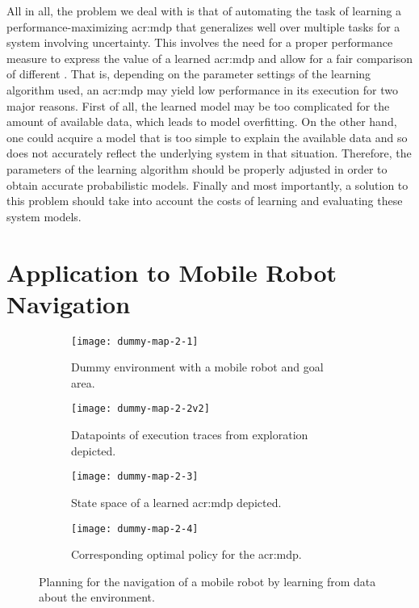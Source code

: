 All in all, the problem we deal with is that of automating the task of learning a performance-maximizing \acrshort{acr:mdp} that generalizes well over multiple tasks for a system involving uncertainty.
This involves the need for a proper performance measure to express the value of a learned \acrshort{acr:mdp} and allow for a fair comparison of different .
That is, depending on the parameter settings of the learning algorithm used, an \acrshort{acr:mdp} may yield low performance in its execution for two major reasons.
First of all, the learned model may be too complicated for the amount of available data, which leads to model overfitting.
On the other hand, one could acquire a model that is too simple to explain the available data and so does not accurately reflect the underlying system in that situation.
Therefore, the parameters of the learning algorithm should be properly adjusted in order to obtain accurate probabilistic models.
Finally and most importantly, a solution to this problem should take into account the costs of learning and evaluating these system models.

\section{Application to Mobile Robot Navigation}
\label{sec:application-mobile-robot}

\begin{figure}[t]
	\centering
	
	\captionsetup{font=small}
	\captionsetup[subfigure]{font=footnotesize}
	\captionsetup[subfigure]{justification=centering}
	\begin{subfigure}{.5\textwidth}
		\centering
		\texttt{[image: dummy-map-2-1]}
		\caption{Dummy environment with a mobile robot and goal area.}
		\label{fig:dummy-map-1}
	\end{subfigure}\hfill
	\begin{subfigure}{.5\textwidth}
		\centering
		\texttt{[image: dummy-map-2-2v2]}
		\caption{Datapoints of execution traces from exploration depicted.}
		\label{fig:dummy-map-2}
	\end{subfigure}
	
	\bigskip
	
	\begin{subfigure}{.5\textwidth}
		\centering
		\texttt{[image: dummy-map-2-3]}
		\caption{State space of a learned \acrshort{acr:mdp} depicted.}
		\label{fig:dummy-map-3}
	\end{subfigure}\hfill
	\begin{subfigure}{.5\textwidth}
		\centering
		\texttt{[image: dummy-map-2-4]}
		\caption{Corresponding optimal policy for the \acrshort{acr:mdp}.}
		\label{fig:dummy-map-4}
	\end{subfigure}
	\caption{Planning for the navigation of a mobile robot by learning  from data about the environment.}
\end{figure}

